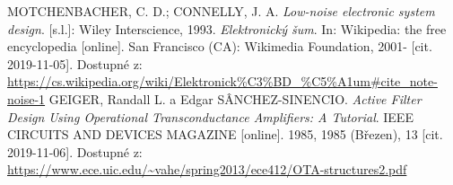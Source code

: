 \begin{thebibliography}{999}
MOTCHENBACHER, C. D.; CONNELLY, J. A. \textit{Low-noise electronic system design}. [s.l.]: Wiley Interscience, 1993.
\textit{Elektronický šum}. In: Wikipedia: the free encyclopedia [online]. San Francisco (CA): Wikimedia Foundation, 2001- [cit. 2019-11-05]. Dostupné z: \url{https://cs.wikipedia.org/wiki/Elektronick%C3%BD_%C5%A1um#cite_note-noise-1}
GEIGER, Randall L. a Edgar SÂNCHEZ-SINENCIO. \textit{Active Filter Design Using Operational Transconductance Amplifiers: A Tutorial}. IEEE CIRCUITS AND DEVICES MAGAZINE [online]. 1985, 1985 (Březen), 13 [cit. 2019-11-06]. Dostupné z: \url{https://www.ece.uic.edu/~vahe/spring2013/ece412/OTA-structures2.pdf}
\end{thebibliography}